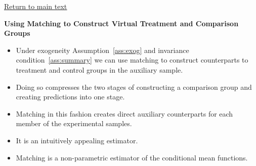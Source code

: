 \documentclass[static]{JJH-Beamer}
\begin{document}
\begin{frame}
 \addtocounter{framenumber}{-1}

\begin{center}
\hyperlink{ret:fruitypebbles}{\underline{Return to main text}}
\end{center}

\end{frame}

\begin{frame}
 \addtocounter{framenumber}{-1}

\hypertarget{potpie}{}
\begin{center}
\textbf{Using Matching to Construct Virtual Treatment and Comparison Groups}
\end{center}

\end{frame}

\begin{frame}
 \addtocounter{framenumber}{-1}

\begin{itemize}
\item Under exogeneity Assumption~\ref{ass:exog} and invariance condition~\ref{ass:summary} we can use matching to construct counterparts to treatment and control groups in the auxiliary sample.
\item Doing so compresses the two stages of constructing a comparison group and creating predictions into one stage.
\item Matching in this fashion creates direct auxiliary counterparts for each member of the experimental samples.
\item It is an intuitively appealing estimator.
\item Matching is a non-parametric estimator of the conditional mean functions.
\end{itemize}

\end{frame}
\end{document}
